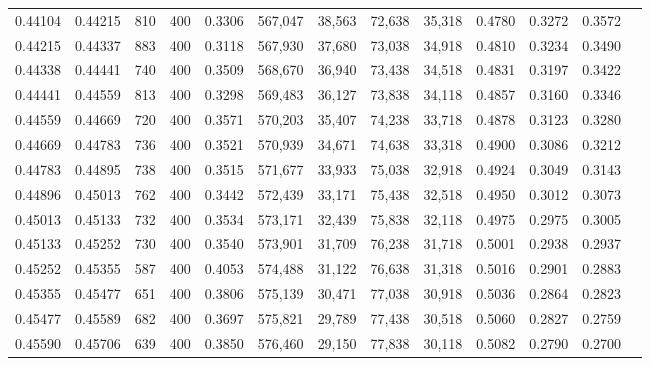 \begin{tabular}{rrrrrrrrrrrrr}
0.44104 & 0.44215 &    810 &   400 &                                     0.3306 & 567,047 &  38,563 &  72,638 &  35,318 & 0.4780 & 0.3272 & 0.3572 \\
0.44215 & 0.44337 &    883 &   400 &                                     0.3118 & 567,930 &  37,680 &  73,038 &  34,918 & 0.4810 & 0.3234 & 0.3490 \\
0.44338 & 0.44441 &    740 &   400 &                                     0.3509 & 568,670 &  36,940 &  73,438 &  34,518 & 0.4831 & 0.3197 & 0.3422 \\
0.44441 & 0.44559 &    813 &   400 &                                     0.3298 & 569,483 &  36,127 &  73,838 &  34,118 & 0.4857 & 0.3160 & 0.3346 \\
0.44559 & 0.44669 &    720 &   400 &                                     0.3571 & 570,203 &  35,407 &  74,238 &  33,718 & 0.4878 & 0.3123 & 0.3280 \\
0.44669 & 0.44783 &    736 &   400 &                                     0.3521 & 570,939 &  34,671 &  74,638 &  33,318 & 0.4900 & 0.3086 & 0.3212 \\
0.44783 & 0.44895 &    738 &   400 &                                     0.3515 & 571,677 &  33,933 &  75,038 &  32,918 & 0.4924 & 0.3049 & 0.3143 \\
0.44896 & 0.45013 &    762 &   400 &                                     0.3442 & 572,439 &  33,171 &  75,438 &  32,518 & 0.4950 & 0.3012 & 0.3073 \\
0.45013 & 0.45133 &    732 &   400 &                                     0.3534 & 573,171 &  32,439 &  75,838 &  32,118 & 0.4975 & 0.2975 & 0.3005 \\
0.45133 & 0.45252 &    730 &   400 &                                     0.3540 & 573,901 &  31,709 &  76,238 &  31,718 & 0.5001 & 0.2938 & 0.2937 \\
0.45252 & 0.45355 &    587 &   400 &                                     0.4053 & 574,488 &  31,122 &  76,638 &  31,318 & 0.5016 & 0.2901 & 0.2883 \\
0.45355 & 0.45477 &    651 &   400 &                                     0.3806 & 575,139 &  30,471 &  77,038 &  30,918 & 0.5036 & 0.2864 & 0.2823 \\
0.45477 & 0.45589 &    682 &   400 &                                     0.3697 & 575,821 &  29,789 &  77,438 &  30,518 & 0.5060 & 0.2827 & 0.2759 \\
0.45590 & 0.45706 &    639 &   400 &                                     0.3850 & 576,460 &  29,150 &  77,838 &  30,118 & 0.5082 & 0.2790 & 0.2700 \\

\end{tabular}
